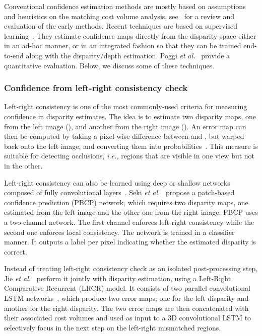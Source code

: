 \documentclass[10pt,journal,compsoc]{IEEEtran}
\newcommand{\ie}{\emph{i.e., }}
\newcommand{\etal}{\emph{et al.}}
\begin{document}
Conventional confidence estimation methods  are mostly based on assumptions and heuristics on the matching cost volume analysis, see~\cite{hu2012quantitative} for a review and evaluation of the early methods.  Recent techniques are based on supervised learning~\cite{haeusler2013ensemble,spyropoulos2014learning,park2015leveraging,poggi2016learningfrom,wannenwetsch2017probflow,batsos2018cbmv}.  They estimate confidence maps directly from the disparity space either in an ad-hoc manner, or in an integrated fashion so that they can be trained end-to-end along with the disparity/depth estimation. Poggi \etal~\cite{poggi2017quantitative} provide  a quantitative evaluation.  Below, we discuss some of these techniques.  












\subsubsection{Confidence from left-right consistency check}  Left-right consistency  is one of the most commonly-used criteria for measuring confidence in disparity estimates.  The idea is to  estimate two disparity maps, one from the left image (), and another  from the right image (). An error map can then be computed by taking a pixel-wise difference between  and , but warped back onto the left image, and converting them into probabilities~\cite{liang2018learning}.  This measure is  suitable for detecting occlusions, \ie regions that are visible in one view but not in the other.

Left-right consistency can  also be learned using  deep or shallow  networks composed of fully convolutional layers~\cite{seki2016patch,jie2018left}.  Seki \etal~\cite{seki2016patch} propose a patch-based confidence prediction (PBCP) network, which requires two disparity maps, one estimated from the left image and the other one from the right image.  PBCP uses a two-channel network. The first channel enforces left-right consistency while the second one enforces local consistency. The network is trained in a classifier manner. It outputs a label per pixel indicating whether the estimated disparity  is correct.


Instead of treating  left-right consistency check as an isolated post-processing step, Jie \etal~\cite{jie2018left} perform it  jointly with disparity estimation, using a  Left-Right Comparative Recurrent (LRCR) model. It   consists of two parallel  convolutional LSTM networks~\cite{xingjian2015convolutional}, which produce   two error maps; one for the left disparity and another for the right disparity.  The two error maps are then concatenated with their associated cost volumes and used as input  to a 3D convolutional LSTM  to selectively focus in  the next step on the left-right mismatched regions. 
\end{document}
